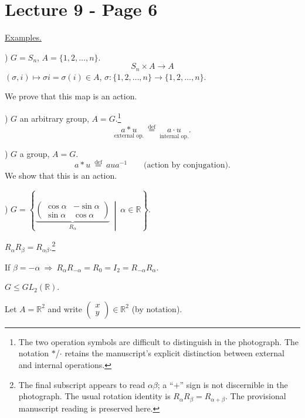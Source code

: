 
\section*{Lecture 9 - Page 6}

\noindent\underline{Examples.}

) $G=S_n$, \qquad $A=\{1,2,\ldots,n\}$.
\[
S_n\times A\longrightarrow A
\]
\noindent $(\sigma,i)\longmapsto \sigma i=\sigma(i)\in A$, \qquad
$\sigma:\{1,2,\ldots,n\}\longrightarrow\{1,2,\ldots,n\}$.

\bigskip
\noindent We prove that this map is an action.

\bigskip
{}) $G$ an arbitrary group, $A=G$.\footnote{The two operation symbols are difficult to distinguish in the photograph. The notation $*$/$\cdot$ retains the manuscript's explicit distinction between external and internal operations.}
\[
\underset{\text{external op.}}{a*u}
\ \overset{\mathrm{def}}{=}\
\underset{\text{internal op.}}{a\cdot u}.
\]

\bigskip
{}) $G$ a group, $A=G$.
\[
a*u\ \overset{\mathrm{def}}{=}\ aua^{-1}
\qquad\text{(action by conjugation)}.
\]
\noindent We show that this is an action.

\bigskip
{}) $G=\left\{
\underbrace{\begin{pmatrix}
\cos\alpha & -\sin\alpha\\
\sin\alpha & \cos\alpha
\end{pmatrix}}_{R_\alpha}
\ \middle|\ \alpha\in\mathbb{R}\right\}$.

\noindent $R_\alpha R_\beta=R_{\alpha\beta}$.\footnote{The final subscript appears to read $\alpha\beta$; a ``$+$'' sign is not discernible in the photograph. The usual rotation identity is $R_\alpha R_\beta=R_{\alpha+\beta}$. The provisional manuscript reading is preserved here.}

\bigskip
\noindent If $\beta=-\alpha\ \Longrightarrow\
R_\alpha R_{-\alpha}=R_0=I_2=R_{-\alpha}R_\alpha$.

\bigskip
\noindent $G\leq GL_2(\mathbb{R})$.

\bigskip
\noindent Let $A=\mathbb{R}^2$ and write
$\begin{pmatrix}x\\y\end{pmatrix}\in\mathbb{R}^2$ (by notation).

